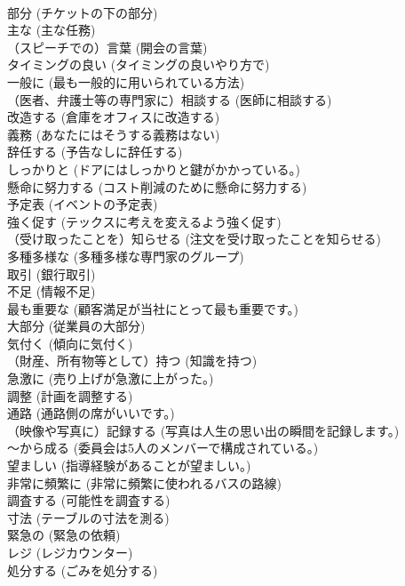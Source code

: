 \documentclass[8pt]{extreport}
\begin{document}
\begin{CJK}{UTF8}{min}
\\	部分	(チケットの下の部分)		
\\	主な	(主な任務)		
\\	（スピーチでの）言葉	(開会の言葉)		
\\	タイミングの良い	(タイミングの良いやり方で)		
\\	一般に	(最も一般的に用いられている方法)		
\\	（医者、弁護士等の専門家に）相談する	(医師に相談する)		
\\	改造する	(倉庫をオフィスに改造する)		
\\	義務	(あなたにはそうする義務はない)		
\\	辞任する	(予告なしに辞任する)		
\\	しっかりと	(ドアにはしっかりと鍵がかかっている。)		
\\	懸命に努力する	(コスト削減のために懸命に努力する)		
\\	予定表	(イベントの予定表)		
\\	強く促す	(テックスに考えを変えるよう強く促す)		
\\	（受け取ったことを）知らせる	(注文を受け取ったことを知らせる)		
\\	多種多様な	(多種多様な専門家のグループ)		
\\	取引	(銀行取引)		
\\	不足	(情報不足)		
\\	最も重要な	(顧客満足が当社にとって最も重要です。)		
\\	大部分	(従業員の大部分)		
\\	気付く	(傾向に気付く)		
\\	（財産、所有物等として）持つ	(知識を持つ)		
\\	急激に	(売り上げが急激に上がった。)		
\\	調整	(計画を調整する)		
\\	通路	(通路側の席がいいです。)		
\\	（映像や写真に）記録する	(写真は人生の思い出の瞬間を記録します。)		
\\	～から成る	(委員会は5人のメンバーで構成されている。)		
\\	望ましい	(指導経験があることが望ましい。)		
\\	非常に頻繁に	(非常に頻繁に使われるバスの路線)		
\\	調査する	(可能性を調査する)		
\\	寸法	(テーブルの寸法を測る)		
\\	緊急の	(緊急の依頼)		
\\	レジ	(レジカウンター)		
\\	処分する	(ごみを処分する)		

\end{CJK}
\end{document}
